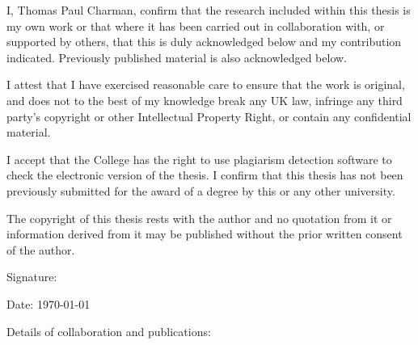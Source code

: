 I, Thomas Paul Charman, confirm that the research included within this thesis is
my own work or that where it has been carried out in collaboration with, or
supported by others, that this is duly acknowledged below and my contribution
indicated. Previously published material is also acknowledged below.

I attest that I have exercised reasonable care to ensure that the work is
original, and does not to the best of my knowledge break any UK law, infringe
any third party’s copyright or other Intellectual Property Right, or contain any
confidential material.

I accept that the College has the right to use plagiarism detection software to
check the electronic version of the thesis. I confirm that this thesis has not
been previously submitted for the award of a degree by this or any other
university.

The copyright of this thesis rests with the author and no quotation from it or
information derived from it may be published without the prior written consent
of the author.

\vspace{2cm}
\noindent Signature:

\noindent Date: \today

\vspace{1cm}
\noindent Details of collaboration and publications:
\clearpage